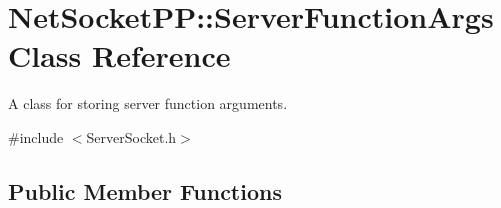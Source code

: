 \hypertarget{class_net_socket_p_p_1_1_server_function_args}{\section{Net\-Socket\-P\-P\-:\-:Server\-Function\-Args Class Reference}
\label{class_net_socket_p_p_1_1_server_function_args}
}


A class for storing server function arguments.  




{\ttfamily \#include $<$Server\-Socket.\-h$>$}

\subsection*{Public Member Functions}
